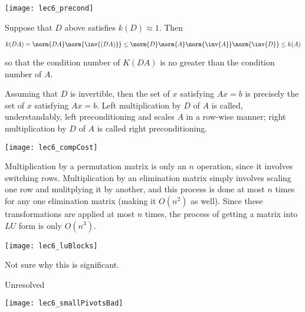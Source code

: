 \documentclass[../main.tex]{subfiles}
\begin{document}
\begin{center}
    \texttt{[image: lec6\_precond]}
\end{center}
\begin{remark}
    Suppose that $D$ above satisfies $k(D) \approx 1$. Then

    \[
        k(DA) = \norm{DA}\norm{\inv{(DA)}} \leq \norm{D}\norm{A}\norm{\inv{A}}\norm{\inv{D}} \leq k(A)
    \]

    so that the condition number of $K(DA)$ is no greater than the condition number of $A$.

    Assuming that $D$ is invertible, then the set of $x$ satisfying
    $Ax = b$ is precisely the set of $x$ satisfying $Ax = b$. Left multiplication
    by $D$ of $A$ is called, understandably, left preconditioning and scales
    $A$ in a row-wise manner; right multiplication by $D$ of $A$ is called right
    preconditioning.
\end{remark}


\begin{remark}
\begin{center}
    \texttt{[image: lec6\_compCost]}
\end{center}

Multiplication by a permutation matrix is only an $n$ operation, since it involves switching rows. Multiplication by an elimination matrix simply involves scaling one row and mulitplying it by another, and this process is done at most $n$ times for any one elimination matrix (making it $O(n^2)$ as well). Since these transformations are applied at most $n$ times, the process of getting a matrix into $LU$ form is only $O(n^3)$.
\end{remark}

\begin{remark}

\begin{center}
    \texttt{[image: lec6\_luBlocks]}
\end{center}

Not sure why this is significant.

\end{remark}


\begin{remark}
    Unresolved
\begin{center}
    \texttt{[image: lec6\_smallPivotsBad]}
\end{center}
\end{remark}
\end{document}
